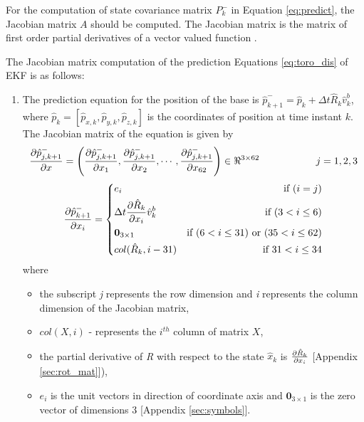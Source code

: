 For the computation of state covariance matrix $P_k^-$ in Equation \ref{eq:predict}, the Jacobian matrix $A$ should be computed. The Jacobian matrix is the matrix of first order partial derivatives of a vector valued function \citep{wal76}.

The Jacobian matrix computation of the prediction Equations \ref{eq:toro_dis} of EKF is as follows:
\begin{enumerate}
\item The prediction equation for the position of the base is $ \hat{p}_{k+1}^- = \hat{p}_k + \Delta t \hat R_k \hat v^b_k$, where  $ \hat{p}_k = [\hat{p}_{x,k},\hat{p}_{y,k},\hat{p}_{z,k}]$ is the coordinates of position at time instant $k$. The Jacobian matrix of the equation is given by
\begin{equation}
\label{eq:dpdx}
\frac{\partial {\hat{p}_{j,k+1}^-}}{\partial {x}} = \left(\frac{\partial {\hat{p}_{j,k+1}^-}}{\partial {x_{1}}}, \frac{\partial {\hat{p}_{j,k+1}^-}}{\partial {x_{2}}}, \cdots , \frac{\partial {\hat{p}_{j,k+1}^-}}{\partial {x_{62}}}\right) \in \Re^{3 \times 62} \hspace{2cm} j=1,2,3
\end{equation}
\[
 \frac{\partial {\hat{p}_{k+1}^-}}{\partial {x_{i}}} =  \left\lbrace
  \!\begin{aligned}
   &e_i & \text{if }(i=j)\\
   &\Delta t \frac{\partial {\hat R_k}}{\partial {x_i}} \hat v^b_k & \text{if }(3 < i \leq 6)\\
   &\textbf{0}_{3 \times 1} &\text{if }(6 < i \leq 31) \text{ or } (35 < i \leq 62) \\
   &col(\hat R_k,i-31) & \text{if } 31 < i \leq 34 \\
  \end{aligned} \right.
\]where
\begin{itemize}
\item the subscript \emph{j} represents the row dimension and \emph{i} represents the column dimension of the Jacobian matrix,
\item $col(X,i)$ - represents the $i^{th}$ column of matrix $X$,
\item the partial derivative of \emph{R} with respect to the state $\hat{x}_k$ is $\frac{\partial {\hat R_k}}{\partial {x_i}}$ [Appendix \ref{sec:rot_mat}]),
\item  $e_i$ is the unit vectors in direction of coordinate axis and  $\textbf{0}_{3 \times 1}$ is the zero vector of dimensions 3 [Appendix \ref{sec:symbols}].
\end{itemize}


\end{enumerate}
